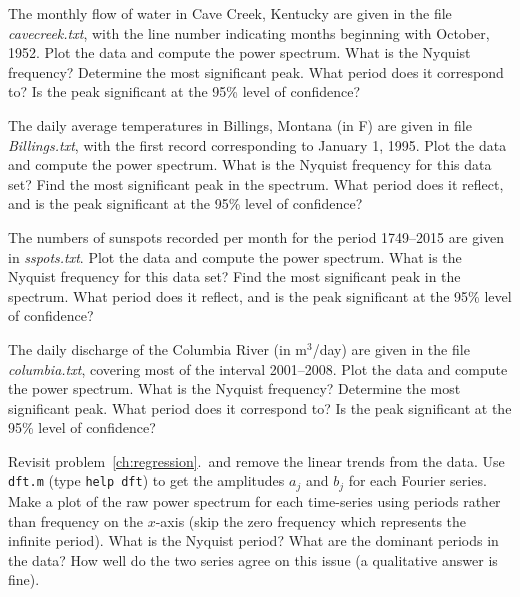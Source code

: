 \begin{problem}
	The monthly flow of water in Cave Creek, Kentucky are given in the file \emph{cavecreek.txt},
	with the line number indicating months beginning with October, 1952.  Plot the data and compute the
	power spectrum.  What is the Nyquist frequency? Determine the most significant peak.  What period does it correspond to? Is the peak significant
	at the 95\% level of confidence?
\end{problem}

\begin{problem}
	The daily average temperatures in Billings, Montana (in \DS F) are given in file \emph{Billings.txt},
	with the first record corresponding to January 1, 1995.  Plot the data and compute the
	power spectrum.  What is the Nyquist frequency for this data set? Find the most significant peak in the spectrum.
	What period does it reflect, and is the peak significant at the 95\% level of confidence?
\end{problem}

\begin{problem}
	The numbers of sunspots recorded per month for the period 1749--2015 are given in \emph{sspots.txt}.
	Plot the data and compute the power spectrum.  What is the Nyquist frequency for this data set? Find the most significant peak in the spectrum.
	What period does it reflect, and is the peak significant at the 95\% level of confidence?
\end{problem}

\begin{problem}
	The daily discharge of the Columbia River (in m$^3$/day) are given in the file \emph{columbia.txt}, covering
	most of the interval 2001--2008. Plot the data and compute the
	power spectrum.  What is the Nyquist frequency? Determine the most significant peak.  What period does it correspond to? Is the peak significant
	at the 95\% level of confidence?
\end{problem}
	
\begin{problem}
	Revisit problem~\ref{ch:regression}.\theEDA\ and 
	remove the linear trends from the data.  Use \texttt{dft.m} (type \texttt{help dft}) to get the amplitudes $a_j$ and $b_j$ for 
	each Fourier series.  Make a plot of the raw power spectrum for each time-series using periods rather 
	than frequency on the $x$-axis (skip the zero frequency which represents the infinite period).  What is the 
	Nyquist period?
	What are the dominant periods in the data?  How well do the two series agree on this issue (a 
	qualitative answer is fine).
\end{problem}

